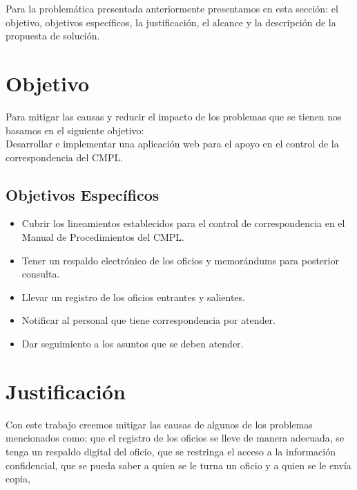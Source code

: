 Para la problemática presentada anteriormente presentamos en esta sección: el objetivo, objetivos específicos, la justificación, el alcance y la descripción de la propuesta de solución.\\


\section{Objetivo}

Para mitigar las causas y reducir el impacto de los problemas que se tienen nos basamos en el siguiente objetivo: \\

Desarrollar e implementar una aplicación web para el apoyo en el control de la correspondencia del CMPL. \\

\subsection{Objetivos Específicos}

\begin{itemize}
	\item Cubrir los lineamientos establecidos para el control de correspondencia en el Manual de Procedimientos del CMPL.
	\item Tener un respaldo electrónico de los oficios y memorándums para posterior consulta.
	\item Llevar un registro de los oficios entrantes y salientes.
	\item Notificar al personal que tiene correspondencia por atender.
	\item Dar seguimiento a los asuntos que se deben atender.
\end{itemize}

\section{Justificación}
Con este trabajo creemos mitigar las causas de algunos de los problemas mencionados como: que el registro de los oficios se lleve de manera adecuada, se tenga un respaldo digital del oficio, que se restringa el acceso a la información confidencial, que se pueda saber a quien se le turna un oficio y a quien se le envía copia,  

